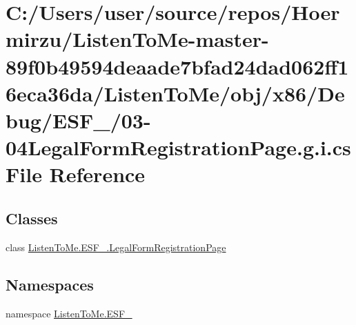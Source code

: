 \hypertarget{03-04_legal_form_registration_page_8g_8i_8cs}{}\section{C\+:/\+Users/user/source/repos/\+Hoermirzu/\+Listen\+To\+Me-\/master-\/89f0b49594deaade7bfad24dad062ff16eca36da/\+Listen\+To\+Me/obj/x86/\+Debug/\+E\+S\+F\+\_/03-\/04\+Legal\+Form\+Registration\+Page.g.\+i.\+cs File Reference}
\label{03-04_legal_form_registration_page_8g_8i_8cs}
\subsection*{Classes}
\begin{DoxyCompactItemize}
\item 
class \hyperlink{class_listen_to_me_1_1_e_s_f__2_1_1_legal_form_registration_page}{Listen\+To\+Me.\+E\+S\+F\+\_.\+Legal\+Form\+Registration\+Page}
\end{DoxyCompactItemize}
\subsection*{Namespaces}
\begin{DoxyCompactItemize}
\item 
namespace \hyperlink{namespace_listen_to_me_1_1_e_s_f__2}{Listen\+To\+Me.\+E\+S\+F\+\_}
\end{DoxyCompactItemize}
